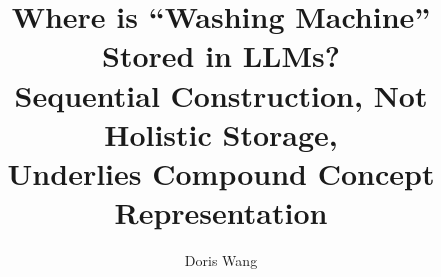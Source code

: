 \documentclass{article}
\title{Where is ``Washing Machine'' Stored in LLMs?\\
Sequential Construction, Not Holistic Storage,\\
Underlies Compound Concept Representation}
\author{
  Doris Wang
}
\begin{document}
\maketitle

\begin{abstract}

\end{abstract}










\end{document}
